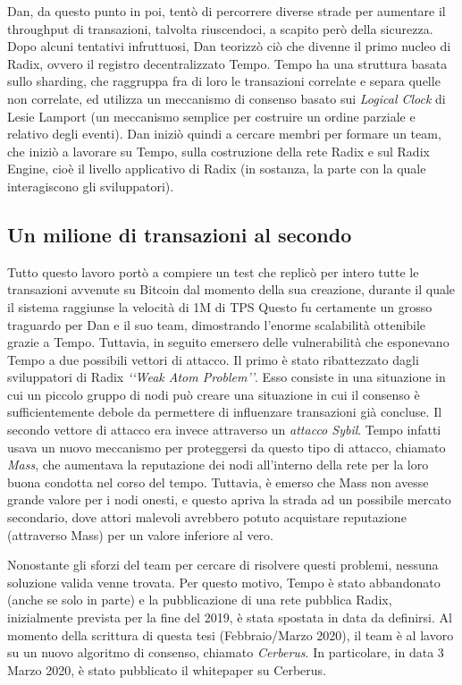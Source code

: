 Dan, da questo punto in poi, tentò di percorrere diverse strade per aumentare il throughput di transazioni, talvolta riuscendoci, a scapito però della sicurezza. Dopo alcuni tentativi infruttuosi, Dan teorizzò ciò che divenne il primo nucleo di Radix, ovvero il registro decentralizzato Tempo. Tempo ha una struttura basata sullo sharding, che raggruppa fra di loro le transazioni correlate e separa quelle non correlate, ed utilizza un meccanismo di consenso basato sui \textit{Logical Clock} di Lesie Lamport \cite{K9} (un meccanismo semplice per costruire un ordine parziale e relativo degli eventi). Dan iniziò quindi a cercare membri per formare un team, che iniziò a lavorare su Tempo, sulla costruzione della rete Radix e sul Radix Engine, cioè il livello applicativo di Radix (in sostanza, la parte con la quale interagiscono gli sviluppatori). 

\subsection{Un milione di transazioni al secondo}

Tutto questo lavoro portò a compiere un test che replicò per intero tutte le transazioni avvenute su Bitcoin dal momento della sua creazione, durante il quale il sistema raggiunse la velocità di 1M di TPS Questo fu certamente un grosso traguardo per Dan e il suo team, dimostrando l'enorme scalabilità ottenibile grazie a Tempo. Tuttavia, in seguito emersero delle vulnerabilità che esponevano Tempo a due possibili vettori di attacco. Il primo è stato ribattezzato dagli sviluppatori di Radix \textit{‘‘Weak Atom Problem’’}. Esso consiste in una situazione in cui un piccolo gruppo di nodi può creare una situazione in cui il consenso è sufficientemente debole da permettere di influenzare transazioni già concluse. Il secondo vettore di attacco era invece attraverso un \textit{attacco Sybil}. Tempo infatti usava un nuovo meccanismo per proteggersi da questo tipo di attacco, chiamato \textit{Mass}, che aumentava la reputazione dei nodi all'interno della rete per la loro buona condotta nel corso del tempo. Tuttavia, è emerso che Mass non avesse grande valore per i nodi onesti, e questo apriva la strada ad un possibile mercato secondario, dove attori malevoli avrebbero potuto acquistare reputazione  (attraverso Mass) per un valore inferiore al vero.

Nonostante gli sforzi del team per cercare di risolvere questi problemi, nessuna soluzione valida venne trovata. Per questo motivo, Tempo è stato abbandonato (anche se solo in parte) e la pubblicazione di una rete pubblica Radix, inizialmente prevista per la fine del 2019, è stata spostata in data da definirsi. Al momento della scrittura di questa tesi (Febbraio/Marzo 2020), il team è al lavoro su un nuovo algoritmo di consenso, chiamato \textit{Cerberus}. In particolare, in data 3 Marzo 2020, è stato pubblicato il whitepaper su Cerberus. 

